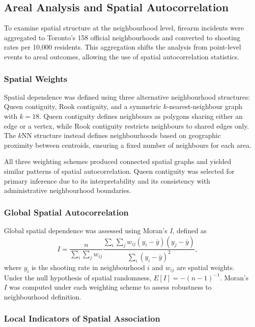 \documentclass{article}
\begin{document}
\subsection{Areal Analysis and Spatial Autocorrelation}

\noindent To examine spatial structure at the neighbourhood level, firearm incidents were aggregated to Toronto’s 158 official neighbourhoods and converted to shooting rates per 10{,}000 residents. This aggregation shifts the analysis from point-level events to areal outcomes, allowing the use of spatial autocorrelation statistics.

\subsubsection{Spatial Weights}

\noindent
Spatial dependence was defined using three alternative neighbourhood structures: Queen contiguity, Rook
contiguity, and a symmetric $k$-nearest-neighbour graph with $k=18$. Queen contiguity defines neighbours as
polygons sharing either an edge or a vertex, while Rook contiguity restricts neighbours to shared edges
only. The $k$NN structure instead defines neighbourhoods based on geographic proximity between centroids,
ensuring a fixed number of neighbours for each area.

\noindent
All three weighting schemes produced connected spatial graphs and yielded similar patterns of spatial
autocorrelation. Queen contiguity was selected for primary inference due to its interpretability and its
consistency with administrative neighbourhood boundaries.


\subsubsection{Global Spatial Autocorrelation}

\noindent Global spatial dependence was assessed using Moran’s $I$, defined as
\[
I = \frac{n}{\sum_{i}\sum_{j} w_{ij}}
\frac{\sum_{i}\sum_{j} w_{ij}(y_i - \bar{y})(y_j - \bar{y})}
{\sum_{i}(y_i - \bar{y})^2},
\]
where $y_i$ is the shooting rate in neighbourhood $i$ and $w_{ij}$ are spatial weights. Under the null hypothesis of spatial randomness, $E[I] = -(n-1)^{-1}$. Moran’s $I$ was computed under each weighting scheme to assess robustness to neighbourhood definition.

\subsubsection{Local Indicators of Spatial Association}
\end{document}
